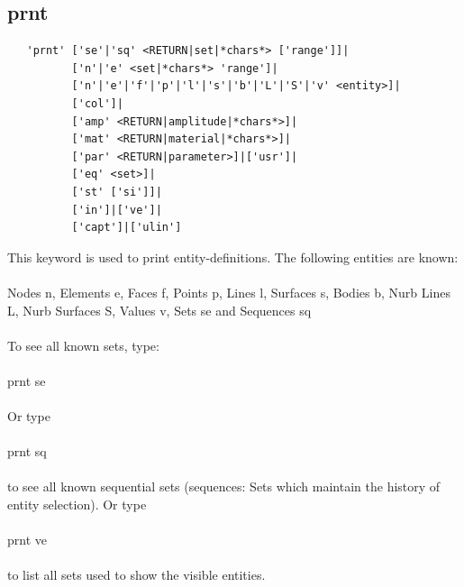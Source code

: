 \documentclass{article}
\begin{document}
\subsection{\label{prnt}prnt}
\begin{verbatim}
   'prnt' ['se'|'sq' <RETURN|set|*chars*> ['range']]|
          ['n'|'e' <set|*chars*> 'range']| 
          ['n'|'e'|'f'|'p'|'l'|'s'|'b'|'L'|'S'|'v' <entity>]| 
          ['col']|
          ['amp' <RETURN|amplitude|*chars*>]|
          ['mat' <RETURN|material|*chars*>]|
          ['par' <RETURN|parameter>]|['usr']|
          ['eq' <set>]|
          ['st' ['si']]|
          ['in']|['ve']|
          ['capt']|['ulin']
\end{verbatim}
This keyword is used to print entity-definitions. The following entities are known:\\\\
Nodes n, Elements e, Faces f, Points p, Lines l, Surfaces s, Bodies b, Nurb
Lines L, Nurb Surfaces S, Values v, Sets se and Sequences sq\\\\To see all
known sets, type:\\\\prnt se\\\\Or type\\\\prnt sq\\\\to see all known
sequential sets (sequences: Sets which maintain the history of entity selection). Or type\\\\prnt ve\\\\to list all sets used to show the visible entities.
\end{document}
